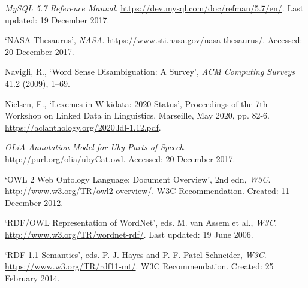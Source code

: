\begin{list}{}
\item %
\textit{MySQL 5.7 Reference Manual}. \url{https://dev.mysql.com/doc/refman/5.7/en/}. Last updated: 19 December 2017.

\item %
`NASA Thesaurus', \textit{NASA}. \url{https://www.sti.nasa.gov/nasa-thesaurus/}. Accessed: 20 December 2017.

\item %
Navigli, R., `Word Sense Disambiguation: A Survey', \textit{ACM Computing Surveys} 41.2 (2009), 1–69.

\item %
Nielsen, F., `Lexemes in Wikidata: 2020 Status', Proceedings of the 7th Workshop on Linked Data in Linguistics, Marseille, May 2020, pp. 82-6. \url{https://aclanthology.org/2020.ldl-1.12.pdf}.

\item %
\textit{OLiA Annotation Model for Uby Parts of Speech}. \url{http://purl.org/olia/ubyCat.owl}. Accessed: 20 December 2017.

\item %
`OWL 2 Web Ontology Language: Document Overview', 2nd edn, \textit{W3C}. \url{http://www.w3.org/TR/owl2-overview/}. W3C Recommendation. Created: 11 December 2012.


\item %
`RDF/OWL Representation of WordNet', eds. M. van Assem et al., \textit{W3C}. \url{http://www.w3.org/TR/wordnet-rdf/}. Last updated: 19 June 2006.


\item %
`RDF 1.1 Semantics', eds. P. J. Hayes and P. F. Patel-Schneider, \textit{W3C}. \url{https://www.w3.org/TR/rdf11-mt/}. W3C Recommendation. Created: 25 February 2014.



\end{list}

